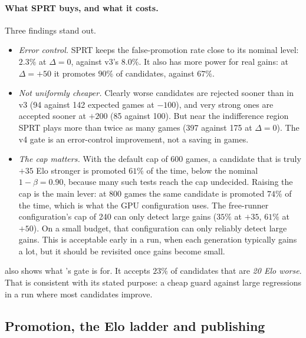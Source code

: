 \paragraph{What SPRT buys, and what it costs.}
Three findings stand out.
\begin{itemize}
  \item \emph{Error control.} SPRT keeps the false-promotion rate close to its nominal
        level: $2.3\%$ at $\Delta=0$, against v3's $8.0\%$. It also has more power for
        real gains: at $\Delta=+50$ it promotes $90\%$ of candidates, against $67\%$.
  \item \emph{Not uniformly cheaper.} Clearly worse candidates are rejected sooner than
        in v3 (94 against 142 expected games at $-100$), and very strong ones are
        accepted sooner at $+200$ (85 against 100). But near the indifference region SPRT
        plays more than twice as many games (397 against 175 at $\Delta=0$). The v4 gate is
        an error-control improvement, not a saving in games.
  \item \emph{The cap matters.} With the default cap of 600 games, a candidate that is
        truly $+35$ Elo stronger is promoted $61\%$ of the time, below the nominal
        $1-\beta=0.90$, because many such tests reach the cap undecided. Raising the cap
        is the main lever: at 800 games the same candidate is promoted $74\%$ of the time,
        which is what the GPU configuration uses. The free-runner configuration's cap of
        240 can only detect large gains ($35\%$ at $+35$, $61\%$ at $+50$). On a
        small budget, that configuration can only reliably detect large gains. This is
        acceptable early in a run, when each generation typically gains a lot, but it
        should be revisited once gains become small.
\end{itemize}
 also shows what \katago{}'s gate is for. It accepts $23\%$ of
candidates that are \emph{20 Elo worse}. That is consistent with its stated purpose: a
cheap guard against large regressions in a run where most candidates improve.

\subsection{Promotion, the Elo ladder and publishing}
\label{sec:orch-publish}

